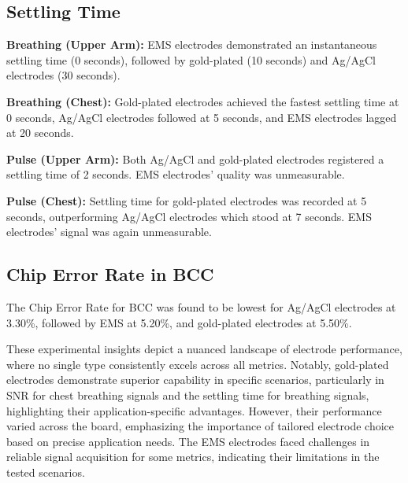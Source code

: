 \documentclass[conference]{IEEEtran}
\begin{document}
\subsection{Settling Time}

 \textbf{Breathing (Upper Arm):} \gls{EMS} electrodes demonstrated an instantaneous settling time (0 seconds), followed by gold-plated (10 seconds) and Ag/AgCl electrodes (30 seconds).
 
    \textbf{Breathing (Chest):} Gold-plated electrodes achieved the fastest settling time at 0 seconds, Ag/AgCl electrodes followed at 5 seconds, and \gls{EMS} electrodes lagged at 20 seconds.
 
    \textbf{Pulse (Upper Arm):} Both Ag/AgCl and gold-plated electrodes registered a settling time of 2 seconds. \gls{EMS} electrodes' quality was unmeasurable.

 \textbf{Pulse (Chest):} Settling time for gold-plated electrodes was recorded at 5 seconds, outperforming Ag/AgCl electrodes which stood at 7 seconds. \gls{EMS} electrodes' signal was again unmeasurable.


\subsection{Chip Error Rate in BCC}

The Chip Error Rate for \gls{BCC} was found to be lowest for Ag/AgCl electrodes at 3.30\%, followed by \gls{EMS} at 5.20\%, and gold-plated electrodes at 5.50\%.

These experimental insights depict a nuanced landscape of electrode performance, where no single type consistently excels across all metrics. Notably, gold-plated electrodes demonstrate superior capability in specific scenarios, particularly in \gls{SNR} for chest breathing signals and the settling time for breathing signals, highlighting their application-specific advantages. However, their performance varied across the board, emphasizing the importance of tailored electrode choice based on precise application needs. The \gls{EMS} electrodes faced challenges in reliable signal acquisition for some metrics, indicating their limitations in the tested scenarios.
\end{document}
